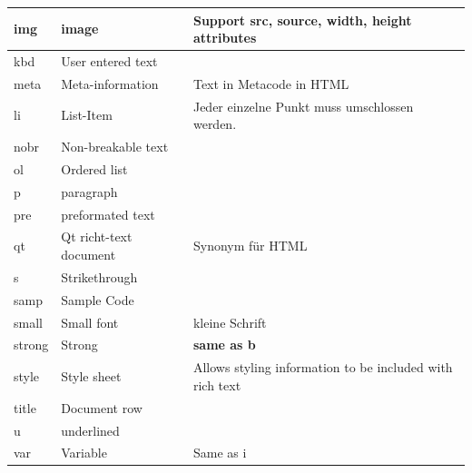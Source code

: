 \begin{longtable}{| p{} | p{} | p{}|}
	\hline img&image& Support src, source, width, height attributes\\
	\hline kbd& User entered text&\\
	\hline meta & Meta-information& Text in Metacode in HTML\\
	\hline li & List-Item& Jeder einzelne Punkt muss umschlossen werden.\\
	\hline nobr & Non-breakable text&\\
	\hline ol & Ordered list& \\
	\hline p & paragraph&\\
	\hline pre & preformated text& \\
	\hline qt & Qt richt-text document& Synonym für HTML\\
	\hline s& Strikethrough&\\
	\hline samp & Sample Code&\\
	\hline small & Small font &{\scriptsize kleine Schrift}\\
	\hline strong & Strong & \textbf{same as b}\\
	\hline style & Style sheet & Allows styling information to be included with rich text\\
	\hline title & Document row & \\
	\hline u & underlined & \\
	\hline var & Variable & Same as i\\
	\hline
\end{longtable}
\clearpage
\newpage
